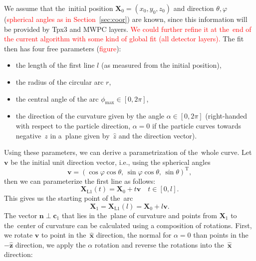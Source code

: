 			We assume that the~initial position $\mathbf{X}_0 = (x_0,y_0,z_0)$ and direction $\theta,\varphi$ (\textcolor{red}{spherical angles as in Section~\ref{sec:coor}}) are known, since this information will be provided by \ac{Tpx3} and \ac{MWPC} layers. \textcolor{red}{We could further refine it at the~end of the current algorithm with some kind of global fit (all detector layers).} The fit then has four free parameters (\textcolor{red}{figure}):
				\begin{itemize}[nosep]
					\item the length of the first line $l$ (as measured from the initial position),
					\item the radius of the circular arc $r$,
					\item the central angle of the arc $\phi_\text{max} \in [0,2\pi]$,
					\item the direction of the curvature given by the angle $\alpha \in [0,2\pi]$ (right-handed with respect to the particle direction, $\alpha = 0$ if the particle curves towards negative~$z$ in a~plane given by~$\hat{z}$ and the direction vector).
				\end{itemize}
			Using these parameters, we can derive a parametrization of the~whole curve. Let $\mathbf{v}$ be the initial unit direction vector, i.e., using the spherical angles
				\begin{equation}
					\mathbf{v} = (\cos\varphi\cos\theta, \,\sin\varphi\cos\theta, \,\sin\theta)^\mathrm{T},
				\end{equation}
			then we can parameterize the first line as follows:
				\begin{equation}
					\mathbf{X}_\text{L1}(t) = \mathbf{X}_0 + t\mathbf{v} \quad t\in[0,l].
				\end{equation}
			This gives us the starting point of the~arc
				\begin{equation}
					\mathbf{X}_1 = \mathbf{X}_\text{L1}(l) = \mathbf{X}_0 + l\mathbf{v}.
				\end{equation}
			The vector $\mathbf{n}\perp\mathbf{c}_1$ that lies in the~plane of curvature and points from $\mathbf{X}_1$ to the~center of curvature can be calculated using a composition of rotations. First, we rotate $\mathbf{v}$ to point in the~$\mathbf{\hat{x}}$ direction, the normal for $\alpha = 0$ than points in the $-\mathbf{\hat{z}}$ direction, we apply the $\alpha$ rotation and reverse the rotations into the~$\mathbf{\hat{x}}$ direction:
